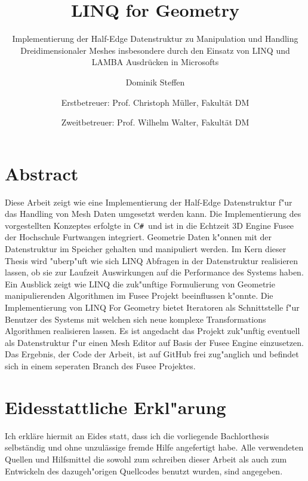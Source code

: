 \documentclass[pagesize, paper=a4, fontsize=12pt,titlepage=true, headings=small, headnosepline, abstractoff, liststotoc, nochapterprefix, plainheadsepline]{scrreprt}
\author{
Dominik Steffen \and
Erstbetreuer: Prof. Christoph Müller, Fakultät DM \and
Zweitbetreuer: Prof. Wilhelm Walter, Fakultät DM
}
\title{LINQ for Geometry}
\subtitle{Implementierung der Half-Edge Datenstruktur zu Manipulation und Handling Dreidimensionaler Meshes insbesondere durch den Einsatz von LINQ und LAMBA Ausdrücken in Microsofts \CS}
\newcommand{\CSS}{C\texttt{\# }}
\newcommand{\LFGS}{LINQ For Geometry }
\begin{document}



\begingroup

\newpage
\pagestyle{empty}
\renewcommand*{\chapterpagestyle}{empty}
\chapter*{Abstract}%
%
Diese Arbeit zeigt wie eine Implementierung der Half-Edge Datenstruktur f"ur das Handling von Mesh Daten umgesetzt werden kann. Die Implementierung des vorgestellten Konzeptes erfolgte in \CSS und ist in die Echtzeit 3D Engine Fusee der Hochschule Furtwangen integriert. Geometrie Daten k"onnen mit der Datenstruktur im Speicher gehalten und manipuliert werden. Im Kern dieser Thesis wird "uberp"uft wie sich LINQ Abfragen in der Datenstruktur realisieren lassen, ob sie  zur Laufzeit Auswirkungen auf die Performance des Systems haben. Ein Ausblick zeigt wie LINQ die zuk"unftige Formulierung von Geometrie manipulierenden Algorithmen im Fusee Projekt beeinflussen k"onnte. Die Implementierung von \LFGS bietet Iteratoren als Schnittstelle f"ur Benutzer des Systems mit welchen sich neue komplexe Transformations Algorithmen realisieren lassen. Es ist angedacht das Projekt zuk"unftig eventuell als Datenstruktur f"ur einen Mesh Editor auf Basis der Fusee Engine einzusetzen. Das Ergebnis, der Code der Arbeit, ist auf GitHub frei zug"anglich und befindet sich in einem seperaten Branch des Fusee Projektes.
\clearpage
\endgroup

\begingroup

\newpage
\pagestyle{empty}
\renewcommand*{\chapterpagestyle}{empty}
\chapter*{Eidesstattliche Erkl"arung}%
%
Ich erkläre hiermit an Eides statt, dass ich die vorliegende Bachlorthesis selbständig und ohne 
unzulässige fremde Hilfe angefertigt habe. Alle verwendeten Quellen und Hilfsmittel die sowohl zum schreiben dieser Arbeit als auch zum Entwickeln des dazugeh"origen Quellcodes benutzt wurden, sind angegeben.
\end{document}
